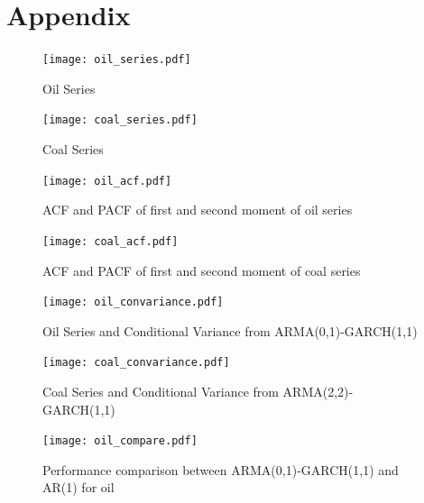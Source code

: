 \documentclass[12pt,a4paper]{article}
\numberwithin{equation}{section}
\begin{document}
\newpage
\section*{Appendix}
\vspace{-8mm}
\begin{figure}[H] 
\texttt{[image: oil\_series.pdf]}
\vspace*{-23mm}
\caption{Oil Series}
\label{oil_series}
\end{figure}
\vspace{-12mm}
\begin{figure}[h!] 
\texttt{[image: coal\_series.pdf]}
\vspace*{-23mm}
\caption{Coal Series}
\label{coal_series}
\end{figure}

\begin{figure}[H] 
\texttt{[image: oil\_acf.pdf]}
\vspace*{-18mm}
\caption{ACF and PACF of first and second moment of oil series}
\label{oil_acf}
\end{figure}

\begin{figure}[H] 
\texttt{[image: coal\_acf.pdf]}
\vspace*{-18mm}
\caption{ACF and PACF of first and second moment of coal series}
\label{coal_acf}
\end{figure}

\begin{figure}[h!] 
\texttt{[image: oil\_convariance.pdf]}
\vspace*{-25mm}
\caption{Oil Series and Conditional Variance from ARMA(0,1)-GARCH(1,1)}
\label{oil_convariance}
\end{figure}

\begin{figure}[H] 
\texttt{[image: coal\_convariance.pdf]}
\vspace*{-25mm}
\caption{Coal Series and Conditional Variance from ARMA(2,2)-GARCH(1,1)}
\label{coal_convariance}
\end{figure}

\begin{figure}[H] 
\texttt{[image: oil\_compare.pdf]}
\vspace*{-23mm}
\caption{Performance comparison between ARMA(0,1)-GARCH(1,1) and AR(1) for oil}
\label{oil_compare}
\end{figure}
\end{document}
